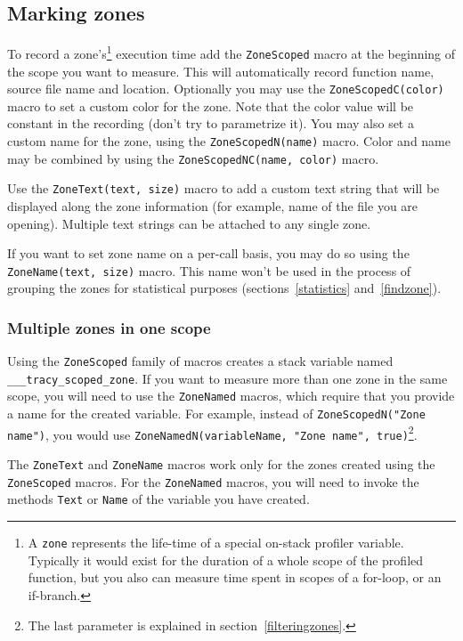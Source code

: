 \documentclass[hidelinks,titlepage,a4paper]{article}
\begin{document}
\subsection{Marking zones}
\label{markingzones}

To record a zone's\footnote{A \texttt{zone} represents the life-time of a special on-stack profiler variable. Typically it would exist for the duration of a whole scope of the profiled function, but you also can measure time spent in scopes of a for-loop, or an if-branch.} execution time add the \texttt{ZoneScoped} macro at the beginning of the scope you want to measure. This will automatically record function name, source file name and location. Optionally you may use the \texttt{ZoneScopedC(color)} macro to set a custom color for the zone. Note that the color value will be constant in the recording (don't try to parametrize it). You may also set a custom name for the zone, using the \texttt{ZoneScopedN(name)} macro. Color and name may be combined by using the \texttt{ZoneScopedNC(name, color)} macro.

Use the \texttt{ZoneText(text, size)} macro to add a custom text string that will be displayed along the zone information (for example, name of the file you are opening). Multiple text strings can be attached to any single zone.

If you want to set zone name on a per-call basis, you may do so using the \texttt{ZoneName(text, size)} macro. This name won't be used in the process of grouping the zones for statistical purposes (sections~\ref{statistics} and~\ref{findzone}).

\subsubsection{Multiple zones in one scope}
\label{multizone}

Using the \texttt{ZoneScoped} family of macros creates a stack variable named \texttt{\_\_\_tracy\_scoped\_zone}. If you want to measure more than one zone in the same scope, you will need to use the \texttt{ZoneNamed} macros, which require that you provide a name for the created variable. For example, instead of \texttt{ZoneScopedN("Zone name")}, you would use \texttt{ZoneNamedN(variableName, "Zone name", true)}\footnote{The last parameter is explained in section~\ref{filteringzones}.}.

The \texttt{ZoneText} and \texttt{ZoneName} macros work only for the zones created using the \texttt{ZoneScoped} macros. For the \texttt{ZoneNamed} macros, you will need to invoke the methods \texttt{Text} or \texttt{Name} of the variable you have created.
\end{document}
